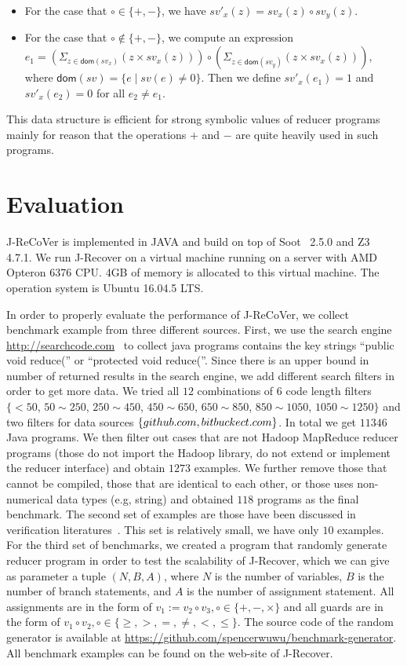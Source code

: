 \documentclass{llncs}
\newcommand{\dom}[1]{\mathsf{dom}(#1)}
\begin{document}
\begin{itemize}
	\item For the case that $\circ \in\{+,-\}$, we have $sv'_x(z) = sv_x(z)\circ  sv_y(z)$.
	\item For the case that $\circ \notin\{+,-\}$, we compute an expression $e_1= (\Sigma_{z\in \dom{sv_x}} (z\times sv_x(z)) )\circ (\Sigma_{z\in \dom{sv_y}} (z\times sv_x(z)))$, where $\dom{sv}=\{e\mid sv(e)\neq 0\}$. Then we define $sv'_x(e_1) =1$ and $sv'_x(e_2) = 0$ for all $e_2\neq e_1$.
\end{itemize}

This data structure is efficient for strong symbolic values of reducer programs mainly for reason that the operations $+$ and $-$ are quite heavily used in such programs.



\section{Evaluation}
\label{section:exp}
J-ReCoVer is implemented in JAVA and build on top of Soot~\cite{soot} 2.5.0 and Z3~\cite{z3} 4.7.1. We run J-Recover on a virtual machine running on a server with AMD Opteron 6376 CPU. 4GB of memory is allocated to this virtual machine. The operation system is Ubuntu 16.04.5 LTS.


 In order to properly evaluate the performance of J-ReCoVer, we collect benchmark example from three different sources.
First, we use the search engine \url{http://searchcode.com}~\cite{searchcode} to collect java programs contains the key strings ``public void reduce('' or ``protected void reduce(''.  Since there is an upper bound in number of returned results in the search engine, we add different search filters in order to get more data. We tried all $12$ combinations of $6$ code length filters $\{<50$, $ 50\sim 250$, $250\sim 450$, $450\sim 650$, $650\sim 850$, $850\sim 1050$, $1050\sim 1250\}$
and two filters for data sources $\{github.com, bitbuckect.com\}$. In total we get $11346$ Java programs. We then filter out cases that are not Hadoop MapReduce reducer programs (those do not import the Hadoop library, do not extend or implement the reducer interface) and obtain $1273$ examples. We further remove those that cannot be compiled, those that are identical to each other, or those uses non-numerical data types (e.g, string) and obtained $118$ programs as the final benchmark.
The second set of examples are those have been discussed in verification literatures~\cite{ChenHSW15,ChenSW16,SmithA16}. This set is relatively small, we have only $10$ examples.
For the third set of benchmarks, we created a program that randomly generate reducer program in order to test the scalability of J-Recover, which we can give as parameter a tuple $(N,B,A)$, where $N$ is the number of variables, $B$ is the number of branch statements, and $A$ is the number of assignment statement. All assignments are in the form of $v_1 := v_2\circ v_3,\circ\in\{+,-,\times\}$ and all guards are in the form of $v_1 \circ v_2, \circ\in\{\geq, >,=, \neq, <,\leq \}$.
 The source code of the random generator is available at \url{https://github.com/spencerwuwu/benchmark-generator}.
All benchmark examples can be found on the web-site of J-Recover.
\end{document}
